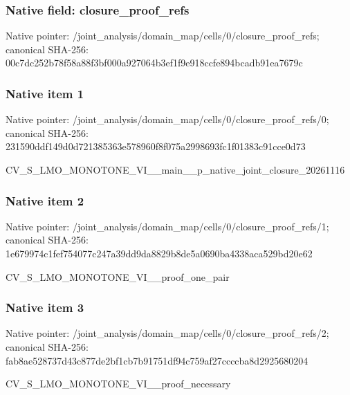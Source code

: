 \documentclass[10pt,a4paper]{article}
\begin{document}
\subsubsection{Native field: closure\_\allowbreak{}proof\_\allowbreak{}refs}
Native pointer: /joint\_\allowbreak{}analysis/domain\_\allowbreak{}map/cells/0/closure\_\allowbreak{}proof\_\allowbreak{}refs; canonical SHA-256: 00c7dc252b78f58a88f3bf000a927064b3ef1f9e918ccfe894bcadb91ea7679c

\subsubsection{Native item 1}
Native pointer: /joint\_\allowbreak{}analysis/domain\_\allowbreak{}map/cells/0/closure\_\allowbreak{}proof\_\allowbreak{}refs/0; canonical SHA-256: 231590ddf149d0d721385363e578960f8f075a2998693fc1f01383c91cce0d73

\begingroup\raggedright\sloppy CV\_\allowbreak{}S\_\allowbreak{}LMO\_\allowbreak{}MONOTONE\_\allowbreak{}VI\_\allowbreak{}\_\allowbreak{}main\_\allowbreak{}\_\allowbreak{}p\_\allowbreak{}native\_\allowbreak{}joint\_\allowbreak{}closure\_\allowbreak{}20261116\par\endgroup

\subsubsection{Native item 2}
Native pointer: /joint\_\allowbreak{}analysis/domain\_\allowbreak{}map/cells/0/closure\_\allowbreak{}proof\_\allowbreak{}refs/1; canonical SHA-256: 1e679974c1fef754077c247a39dd9da8829b8de5a0690ba4338aca529bd20e62

\begingroup\raggedright\sloppy CV\_\allowbreak{}S\_\allowbreak{}LMO\_\allowbreak{}MONOTONE\_\allowbreak{}VI\_\allowbreak{}\_\allowbreak{}proof\_\allowbreak{}one\_\allowbreak{}pair\par\endgroup

\subsubsection{Native item 3}
Native pointer: /joint\_\allowbreak{}analysis/domain\_\allowbreak{}map/cells/0/closure\_\allowbreak{}proof\_\allowbreak{}refs/2; canonical SHA-256: fab8ae528737d43c877de2bf1cb7b91751df94c759af27ccccba8d2925680204

\begingroup\raggedright\sloppy CV\_\allowbreak{}S\_\allowbreak{}LMO\_\allowbreak{}MONOTONE\_\allowbreak{}VI\_\allowbreak{}\_\allowbreak{}proof\_\allowbreak{}necessary\par\endgroup
\end{document}
